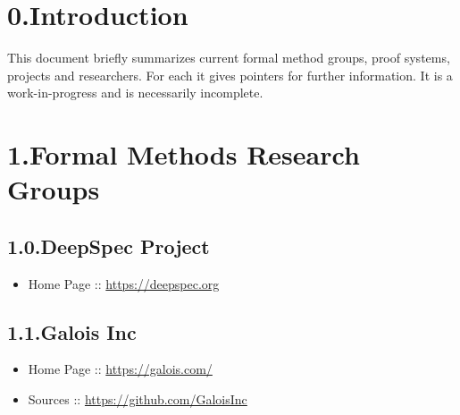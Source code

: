 \documentclass[12pt,twoside]{article}
\begin{document}
\section{0.\hspace*{0.5em}Introduction}\label{sec-introduction}%

\noindent{}This document briefly summarizes current formal method groups, proof
systems, projects and researchers. For each it gives pointers for
further information. It is a work-in-progress and is necessarily
incomplete.%

\section{1.\hspace*{0.5em}Formal Methods Research Groups}\label{sec-formal-methods-research-groups}%

\subsection{1.0.\hspace*{0.5em}DeepSpec Project}\label{sec-deepspec-project}%

\begin{itemize}[noitemsep,topsep=\mdcompacttopsep]%

\item{}Home Page :: \href{https://deepspec.org}{{\ttfamily https://\hspace{0pt}deepspec.\hspace{0pt}org}}%
\end{itemize}%

\subsection{1.1.\hspace*{0.5em}Galois Inc}\label{sec-galois-inc}%

\begin{itemize}[noitemsep,topsep=\mdcompacttopsep]%

\item{}Home Page :: \href{https://galois.com/}{{\ttfamily https://\hspace{0pt}galois.\hspace{0pt}com/\hspace{0pt}}}%

\item{}Sources :: \href{https://github.com/GaloisInc}{{\ttfamily https://\hspace{0pt}github.\hspace{0pt}com/\hspace{0pt}GaloisInc}}%
\end{itemize}%
\end{document}
